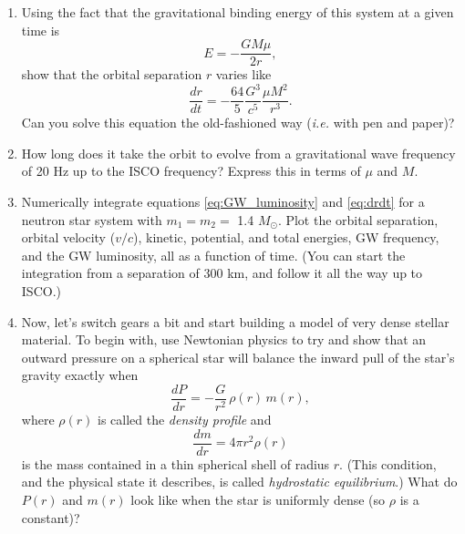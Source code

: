 \documentclass[11pt]{article}
\begin{document}
\vspace{1000pt}

\begin{enumerate}

\item Using the fact that the gravitational binding energy of this system at a given time is
\[ E = - \frac{GM\mu}{2r}, \]
show that the orbital separation $r$ varies like
\begin{equation}\label{eq:drdt}
\frac{dr}{dt} = - \frac{64}{5} \frac{G^3}{c^5} \frac{\mu M^2}{r^3}.
\end{equation}
Can you solve this equation the old-fashioned way (\textit{i.e.} with pen and paper)?

\item How long does it take the orbit to evolve from a gravitational wave frequency of 20 Hz up to the ISCO frequency? Express this in terms of $\mu$ and $M$.

\item Numerically integrate equations \ref{eq:GW_luminosity} and \ref{eq:drdt} for a neutron star system with $m_1 = m_2 =$ 1.4 $M_{\odot}$. Plot the orbital separation, orbital velocity ($v/c$), kinetic, potential, and total energies, GW frequency, and the GW luminosity, all as a function of time. (You can start the integration from a separation of 300 km, and follow it all the way up to ISCO.)

\item Now, let's switch gears a bit and start building a model of very dense stellar material. To begin with, use Newtonian physics to try and show that an outward pressure on a spherical star will balance the inward pull of the star's gravity exactly when
\begin{equation}\label{eq:hydro}
\frac{dP}{dr} = - \frac{G}{r^2}\, \rho(r)\, m(r),
\end{equation}
where $\rho(r)$ is called the \textit{density profile} and
\begin{equation}\label{eq:mass}
\frac{dm}{dr} = 4 \pi r^2 \rho(r)
\end{equation}
is the mass contained in a thin spherical shell of radius $r$. (This condition, and the physical state it describes, is called \textit{hydrostatic equilibrium}.) What do $P(r)$ and $m(r)$ look like when the star is uniformly dense (so $\rho$ is a constant)?


\end{enumerate}
\end{document}
